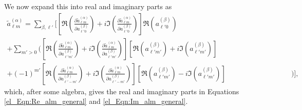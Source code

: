 We now expand this into real and imaginary parts as
\begin{equation}
\begin{split}
\widetilde{a}_{\ell m}^{ \left( \alpha \right) } =
\sum_{\beta, \ell'} \Bigg[
\left[ \Re \left(
\frac{\partial \widetilde{a}_{\ell m}^{ \left( \alpha \right) }}
{\partial a_{\ell' 0}^{ \left( \beta \right) }}
\right) + i \Im \left(
\frac{\partial \widetilde{a}_{\ell m}^{ \left( \alpha \right) }}
{\partial a_{\ell' 0}^{ \left( \beta \right) }}
\right) \right]
\Re \left( a_{\ell' 0}^{ \left( \beta \right) } \right)
\qquad\qquad\qquad\qquad\qquad\qquad\qquad\quad & \\
+
\sum_{m' > 0} \Bigg(
\left[ \Re \left(
\frac{\partial \widetilde{a}_{\ell m}^{ \left( \alpha \right) }}
{\partial a_{\ell' m'}^{ \left( \beta \right) }}
\right) + i \Im \left(
\frac{\partial \widetilde{a}_{\ell m}^{ \left( \alpha \right) }}
{\partial a_{\ell' m'}^{ \left( \beta \right) }}
\right) \right]
\left[ \Re \left(
a_{\ell' m'}^{ \left( \beta \right) }
\right) + i \Im \left(
a_{\ell' m'}^{ \left( \beta \right) }
\right) \right] & \\
+
\left( -1 \right)^{m'}
\left[ \Re \left(
\frac{\partial \widetilde{a}_{\ell m}^{ \left( \alpha \right) }}
{\partial a_{\ell' -m'}^{ \left( \beta \right) }}
\right) + i \Im \left(
\frac{\partial \widetilde{a}_{\ell m}^{ \left( \alpha \right) }}
{\partial a_{\ell' -m'}^{ \left( \beta \right) }}
\right) \right]
\left[ \Re \left(
a_{\ell' m'}^{ \left( \beta \right) }
\right) - i \Im \left(
a_{\ell' m'}^{ \left( \beta \right) }
\right) \right] &
\Bigg) \Bigg],
\end{split}
\end{equation}
which, after some algebra, gives the real and imaginary parts in Equations
\eqref{el_Eqn:Re_alm_general}
and
\eqref{el_Eqn:Im_alm_general}.

